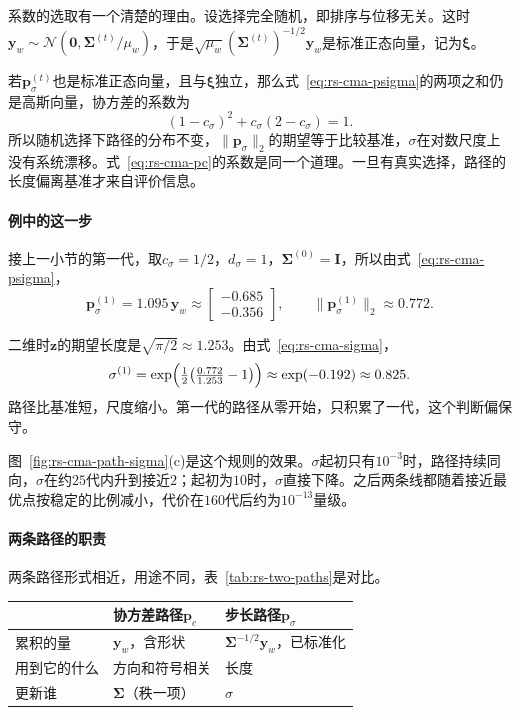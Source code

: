 系数的选取有一个清楚的理由。设选择完全随机，即排序与位移无关。这时$\bm{y}_w\sim\mathcal{N}(\bm{0},\bm{\Sigma}^{(t)}/\mu_w)$，于是$\sqrt{\mu_w}(\bm{\Sigma}^{(t)})^{-1/2}\bm{y}_w$是标准正态向量，记为$\bm{\xi}$。

若$\bm{p}_\sigma^{(t)}$也是标准正态向量，且与$\bm{\xi}$独立，那么式~\eqref{eq:rs-cma-psigma}的两项之和仍是高斯向量，协方差的系数为
\[
 (1-c_\sigma)^2+c_\sigma(2-c_\sigma)=1.
\]
所以随机选择下路径的分布不变，$\lVert\bm{p}_\sigma\rVert_2$的期望等于比较基准，$\sigma$在对数尺度上没有系统漂移。式~\eqref{eq:rs-cma-pc}的系数是同一个道理。一旦有真实选择，路径的长度偏离基准才来自评价信息。

\paragraph{例中的这一步}
接上一小节的第一代，取$c_\sigma=1/2$，$d_\sigma=1$，$\bm{\Sigma}^{(0)}=\bm{I}$，所以由式~\eqref{eq:rs-cma-psigma}，
\[
 \bm{p}_\sigma^{(1)}=1.095\,\bm{y}_w\approx\begin{bmatrix}-0.685\\-0.356\end{bmatrix},\qquad\lVert\bm{p}_\sigma^{(1)}\rVert_2\approx0.772.
\]

二维时$\bm{z}$的期望长度是$\sqrt{\pi/2}\approx1.253$。由式~\eqref{eq:rs-cma-sigma}，
\[
 \sigma^{(1)}=\exp\Bigl(\tfrac12\bigl(\tfrac{0.772}{1.253}-1\bigr)\Bigr)\approx\exp(-0.192)\approx0.825.
\]
路径比基准短，尺度缩小。第一代的路径从零开始，只积累了一代，这个判断偏保守。

图~\ref{fig:rs-cma-path-sigma}(c)是这个规则的效果。$\sigma$起初只有$10^{-3}$时，路径持续同向，$\sigma$在约$25$代内升到接近$2$；起初为$10$时，$\sigma$直接下降。之后两条线都随着接近最优点按稳定的比例减小，代价在$160$代后约为$10^{-13}$量级。

\paragraph{两条路径的职责}
两条路径形式相近，用途不同，表~\ref{tab:rs-two-paths}是对比。

\begin{BookInlineTable}
 \centering
 \caption{两条演化路径。}
 \label{tab:rs-two-paths}
 \begin{tabular}{lll}
  \toprule
  & 协方差路径$\bm{p}_c$ & 步长路径$\bm{p}_\sigma$ \\
  \midrule
  累积的量 & $\bm{y}_w$，含形状 & $\bm{\Sigma}^{-1/2}\bm{y}_w$，已标准化 \\
  用到它的什么 & 方向和符号相关 & 长度 \\
  更新谁 & $\bm{\Sigma}$（秩一项） & $\sigma$ \\
  \bottomrule
 \end{tabular}
\end{BookInlineTable}

